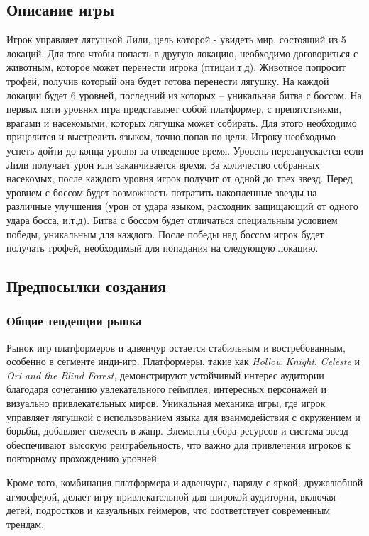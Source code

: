 \documentclass{article}
\begin{document}
\subsection{Описание игры}
Игрок управляет лягушкой Лили, цель которой - увидеть мир, состоящий из 5 локаций. Для того чтобы попасть в другую локацию, необходимо договориться с животным, которое может перенести игрока (птица и.т.д). Животное попросит трофей, получив который она будет готова перенести лягушку. На каждой локации будет 6 уровней, последний из которых – уникальная битва с боссом. На первых пяти уровнях игра представляет собой платформер, с препятствиями, врагами и насекомыми, которых лягушка может собирать. Для этого необходимо прицелится и выстрелить языком, точно попав по цели. Игроку необходимо успеть дойти до конца уровня за отведенное время. Уровень перезапускается если Лили получает урон или заканчивается время. За количество собранных насекомых, после каждого уровня игрок получит от одной до трех звезд. Перед уровнем с боссом будет возможность потратить накопленные звезды на различные улучшения (урон от удара языком, расходник защищающий от одного удара босса, и.т.д). Битва с боссом будет отличаться специальным условием победы, уникальным для каждого. После победы над боссом игрок будет получать трофей, необходимый для попадания на следующую локацию.


\subsection{Предпосылки создания}

\subsubsection{Общие тенденции рынка}

Рынок игр платформеров и адвенчур остается стабильным и востребованным, особенно в сегменте инди-игр. Платформеры, такие как \textit{Hollow Knight}, \textit{Celeste} и \textit{Ori and the Blind Forest}, демонстрируют устойчивый интерес аудитории благодаря сочетанию увлекательного геймплея, интересных персонажей и визуально привлекательных миров. Уникальная механика игры, где игрок управляет лягушкой с использованием языка для взаимодействия с окружением и борьбы, добавляет свежесть в жанр. Элементы сбора ресурсов и система звезд обеспечивают высокую реиграбельность, что важно для привлечения игроков к повторному прохождению уровней. 

Кроме того, комбинация платформера и адвенчуры, наряду с яркой, дружелюбной атмосферой, делает игру привлекательной для широкой аудитории, включая детей, подростков и казуальных геймеров, что соответствует современным трендам.
\end{document}
